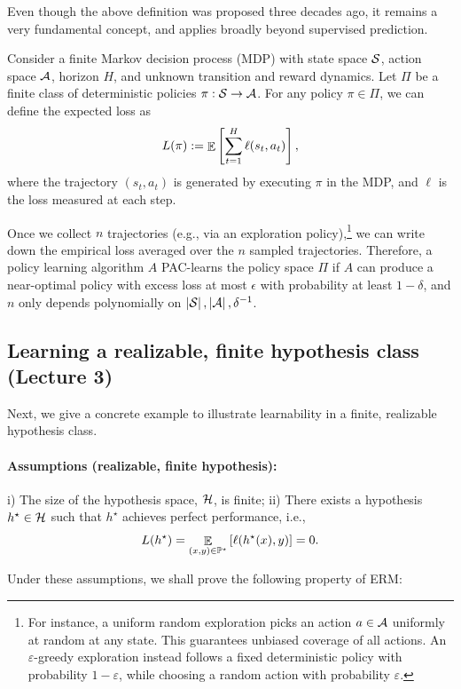 \begin{example}
    Even though the above definition was proposed three decades ago, it remains a very fundamental concept, and applies broadly beyond supervised prediction.

    Consider a finite Markov decision process (MDP) with state space $\mathcal{S}$, action space $\mathcal{A}$, horizon $H$, and unknown transition and reward dynamics.
    Let $\Pi$ be a finite class of deterministic policies $\pi: \mathcal{S} \rightarrow \mathcal{A}$.
    For any policy $\pi \in \Pi$, we can define the expected loss as
    \[ L(\pi) := \mathop{\mathbb{E}}\left[ \sum_{t = 1}^H \ell(s_t, a_t)  \right], \] 
    where the trajectory $(s_t, a_t)$ is generated by executing $\pi$ in the MDP, and $\ell$ is the loss measured at each step.

    Once we collect $n$ trajectories (e.g., via an exploration policy),\footnote{For instance, a uniform random exploration picks an action $a\in\mathcal{A}$ uniformly at random at any state. This guarantees unbiased coverage of all actions. An $\varepsilon$-greedy exploration instead follows a fixed deterministic policy with probability $1- \varepsilon$, while choosing a random action with probability $\varepsilon$.} we can write down the empirical loss averaged over the $n$ sampled trajectories.
    Therefore, a policy learning algorithm $A$ PAC-learns the policy space $\Pi$ if $A$ can produce a near-optimal policy with excess loss at most $\epsilon$ with probability at least $1 - \delta$, and $n$ only depends polynomially on $\left\lvert\mathcal{S}\right\rvert, \left\lvert\mathcal{A}\right\rvert, \delta^{-1}$.
\end{example}

\subsection{Learning a realizable, finite hypothesis class (Lecture 3)}

Next, we give a concrete example to illustrate learnability in a finite, realizable hypothesis class.

\paragraph{Assumptions (realizable, finite hypothesis):}
i) The size of the hypothesis space, $\mathcal{H}$, is finite;
ii) There exists a hypothesis $h^{\star} \in \mathcal{H}$ such that $h^{\star}$ achieves perfect performance, i.e., \[ L(h^{\star}) = \mathop{\mathbb{E}}_{(x, y) \in \mathbb{P}^{\star}}\left[ \ell( h^{\star}(x), y ) \right] = 0. \]

Under these assumptions, we shall prove the following property of ERM:

